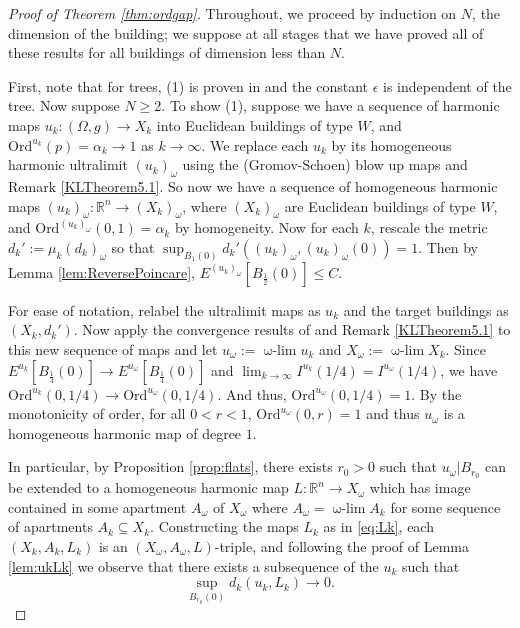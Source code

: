 \documentclass[12pt]{amsart}
\theoremstyle{definition}
\numberwithin{equation}{section}
\newcommand{\R}{\mathbb R}
\newcommand\wlim{\mathop{\mbox{$\omega$-$\lim$}}}
\begin{document}
\begin{proof}[Proof of Theorem \ref{thm:ordgap}]
Throughout, we proceed by induction on $N$, the dimension of the building; we suppose at all stages that we have proved all of these results for all buildings of dimension less than $N$.


First, note that for trees, (1) is proven in \cite[Theorem 3.8]{sun} and the constant $\epsilon$ is independent of the tree. Now suppose $N \geq 2$. To show (1), suppose we have a sequence of harmonic maps $u_k:(\Omega,g)\to X_k$ into Euclidean buildings of type $W$, and $\text{Ord}^{u_k}(p)=\alpha_k\to1$ as $k\to\infty$. We replace each $u_k$ by its homogeneous harmonic ultralimit $(u_k)_\omega$ using the (Gromov-Schoen) blow up maps and Remark \ref{KLTheorem5.1}. 
So now we have a sequence of homogeneous harmonic maps $(u_k)_\omega:\R^n \to (X_k)_\omega$, where $(X_k)_\omega$ are Euclidean buildings of type $W$, and $\text{Ord}^{(u_k)_\omega}(0,1)=\alpha_k$ by homogeneity. Now for each $k$, rescale the metric $d_k':= \mu_k (d_k)_\omega$ so that $\sup_{B_1(0)} d_k'((u_k)_\omega,(u_k)_\omega(0))=1$. Then by Lemma \ref{lem:ReversePoincare}, $E^{(u_k)_\omega}[B_{\frac 12}(0)]\leq C$.

For ease of notation, relabel the ultralimit maps as $u_k$ and the target buildings as $(X_k,d_k')$. Now apply the convergence results of \cite[Section 3]{korevaar-schoen2} and Remark \ref{KLTheorem5.1} to this new sequence of maps and let $ u_\omega:= \wlim u_k$ and $X_\omega:= \wlim X_k$. Since $E^{u_k}[B_{\frac 14}(0)]\to E^{ u_\omega}[B_{\frac 14}(0)]$ and $\lim_{k \to \infty}I^{u_k}(1/4)=I^{ u_\omega}(1/4)$, we have $\text{Ord}^{u_k}(0,1/4)\to\text{Ord}^{ u_\omega}(0,1/4)$. And thus, $\text{Ord}^{ u_\omega}(0,1/4)=1$.  By the monotonicity of order, for all $0<r<1$, $\text{Ord}^{ u_\omega}(0,r)=1$ and thus $ u_\omega$ is a homogeneous harmonic map of degree $1$. 

In particular, by Proposition \ref{prop:flats}, there exists $r_0>0$ such that $u_\omega|B_{r_0}$ can be extended to a homogeneous harmonic map $L:\R^n \to X_\omega$ which has image contained in some apartment $A_\omega$ of $ X_\omega$ where $A_\omega=\wlim A_k$ for some sequence of apartments $A_k\subseteq X_k$. Constructing the maps $L_k$ as in \eqref{eq:Lk}, each $(X_k ,A_k,L_k)$ is an $(X_\omega,A_\omega,L)$-triple, and following the proof of Lemma \ref{lem:ukLk} we observe that there exists a subsequence of the $u_k$ such that
\[
\sup_{B_{r_0}(0)}d_k(u_k,L_k)\to0.
\]


\end{proof}
\end{document}
